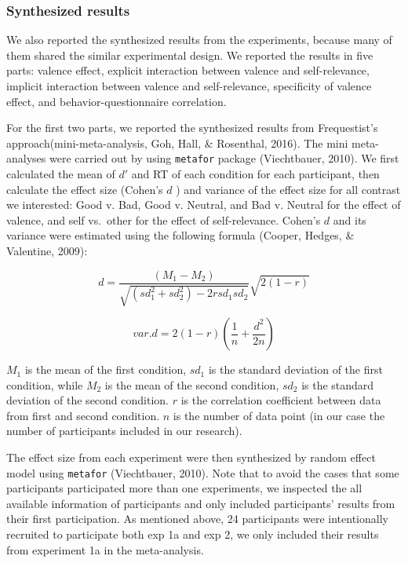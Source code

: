 \documentclass[
  english,
  man]{apa6}
\begin{document}
\hypertarget{synthesized-results}{%
\subsubsection{Synthesized results}\label{synthesized-results}}

We also reported the synthesized results from the experiments, because many of them shared the similar experimental design. We reported the results in five parts: valence effect, explicit interaction between valence and self-relevance, implicit interaction between valence and self-relevance, specificity of valence effect, and behavior-questionnaire correlation.

For the first two parts, we reported the synthesized results from Frequestist's approach(mini-meta-analysis, Goh, Hall, \& Rosenthal, 2016). The mini meta-analyses were carried out by using \texttt{metafor} package (Viechtbauer, 2010). We first calculated the mean of \(d'\) and RT of each condition for each participant, then calculate the effect size (Cohen's \(d\) ) and variance of the effect size for all contrast we interested: Good v. Bad, Good v. Neutral, and Bad v. Neutral for the effect of valence, and self vs.~other for the effect of self-relevance. Cohen's \(d\) and its variance were estimated using the following formula (Cooper, Hedges, \& Valentine, 2009):

\[d = \frac {(M_{1} - M_{2})}{\sqrt {(sd_{1}^2 + sd_{2}^2) - 2rsd_{1}sd_{2}}}  \sqrt {2(1-r)}\]

\[var.d = 2 (1-r)  (\frac{1}{n} + \frac{d^2}{2n})\]

\(M_1\) is the mean of the first condition, \(sd_1\) is the standard deviation of the first condition, while \(M_2\) is the mean of the second condition, \(sd_2\) is the standard deviation of the second condition. \(r\) is the correlation coefficient between data from first and second condition. \(n\) is the number of data point (in our case the number of participants included in our research).

The effect size from each experiment were then synthesized by random effect model using \texttt{metafor} (Viechtbauer, 2010). Note that to avoid the cases that some participants participated more than one experiments, we inspected the all available information of participants and only included participants' results from their first participation. As mentioned above, 24 participants were intentionally recruited to participate both exp 1a and exp 2, we only included their results from experiment 1a in the meta-analysis.
\end{document}
